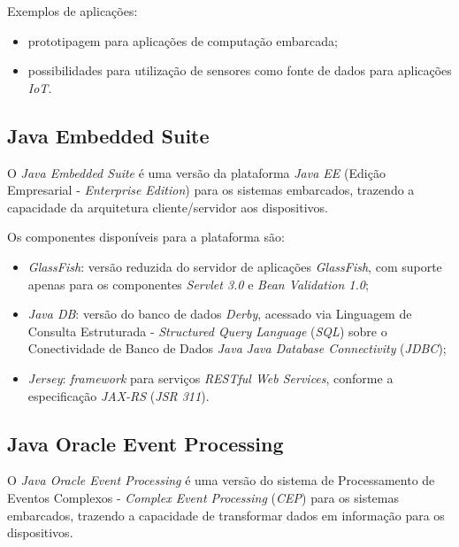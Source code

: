Exemplos de aplicações:

\begin{itemize}
    
    \item prototipagem para aplicações de computação embarcada;
    
    \item possibilidades para utilização de sensores como fonte de dados para 
    aplicações \textit{IoT}.
    
\end{itemize}

\subsection{Java Embedded Suite}

O \textit{Java Embedded Suite} é uma versão da plataforma \textit{Java EE} 
(Edição Empresarial - \textit{Enterprise Edition}) para os sistemas embarcados, 
trazendo a capacidade da arquitetura cliente/servidor aos dispositivos.

Os componentes disponíveis para a plataforma são:

\begin{itemize}
    
    \item \textit{GlassFish}: versão reduzida do servidor de aplicações 
    \textit{GlassFish}, com suporte apenas para os componentes \textit{Servlet 3.0} e \textit{Bean Validation 1.0};
    
    \item \textit{Java DB}: versão do banco de dados \textit{Derby}, acessado 
    via Linguagem de Consulta Estruturada - \textit{Structured Query Language} 
    (\textit{SQL}) sobre o Conectividade de Banco de Dados \textit{Java} 
    \textit{Java Database Connectivity} (\textit{JDBC});
    
    \item \textit{Jersey}: \textit{framework} para serviços \textit{RESTful Web 
    Services}, conforme a especificação \textit{JAX-RS} (\textit{JSR 311}).

\end{itemize}

\subsection{Java Oracle Event Processing}

O \textit{Java Oracle Event Processing} é uma versão do sistema de 
Processamento de Eventos Complexos - \textit{Complex Event Processing} 
(\textit{CEP}) para os sistemas embarcados, trazendo a capacidade de 
transformar dados em informação para os dispositivos.


